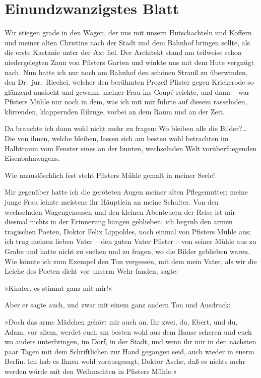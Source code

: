 \section{Einundzwanzigstes Blatt}

Wir stiegen grade in den Wagen, der uns mit unsern Hutschachteln
und Koffern und meiner alten Christine nach der Stadt und dem
Bahnhof bringen sollte, als die erste Kastanie unter der Axt fiel.
Der Architekt stand am teilweise schon niedergelegten Zaun von
Pfisters Garten und winkte uns mit dem Hute vergnügt nach. Nun
hatte ich nur noch am Bahnhof den schönen Strauß zu überwinden, den
Dr.~jur.~Riechei, welcher den berühmten Prozeß Pfister gegen
Krickerode so glänzend ausfocht und gewann, meiner Frau ins Coupé
reichte, und dann – war Pfisters Mühle nur noch in dem, was ich mit
mir führte auf diesem rasselnden, klirrenden, klappernden Eilzuge,
vorbei an dem Raum und an der Zeit.

Da brauchte ich dann wohl nicht mehr zu fragen: Wo bleiben alle die
Bilder?\ldots{} Die von ihnen, welche bleiben, lassen sich am besten
wohl betrachten im Halbtraum vom Fenster eines an der bunten,
wechselnden Welt vorüberfliegenden Eisenbahnwagens.~–

Wie unauslöschlich fest steht Pfisters Mühle gemalt in meiner
Seele!

Mir gegenüber hatte ich die geröteten Augen meiner alten
Pflegemutter; meine junge Frau lehnte meistens ihr Häuptlein an
meine Schulter. Von den wechselnden Wagengenossen und den kleinen
Abenteuern der Reise ist mir diesmal nichts in der Erinnerung
hängen geblieben: ich begrub den armen tragischen Poeten, Doktor
Felix Lippoldes, noch einmal von Pfisters Mühle aus; ich trug
meinen lieben Vater – den guten Vater Pfister – von seiner Mühle
aus zu Grabe und hatte nicht zu suchen und zu fragen, wo die Bilder
geblieben waren. Wie könnte ich zum Exempel den Ton vergessen, mit
dem mein Vater, als wir die Leiche des Poeten dicht vor unserm Wehr
fanden, sagte:

»Kinder, es stimmt ganz mit mir!«

Aber er sagte auch, und zwar mit einem ganz andern Ton und
Ausdruck:

»Doch das arme Mädchen gehört mir auch an. Ihr zwei, du, Ebert, und
du, Adam, vor allem, werdet euch am besten wohl aus dem Hause
scheren und euch wo anders unterbringen, im Dorf, in der Stadt, und
wenn ihr mir in den nächsten paar Tagen mit dem Schriftlichen zur
Hand gegangen seid, auch wieder in euerm Berlin. Ich hab es Ihnen
wohl vorausgesagt, Doktor Asche, daß es nichts mehr werden würde
mit den Weihnachten in Pfisters Mühle.«

